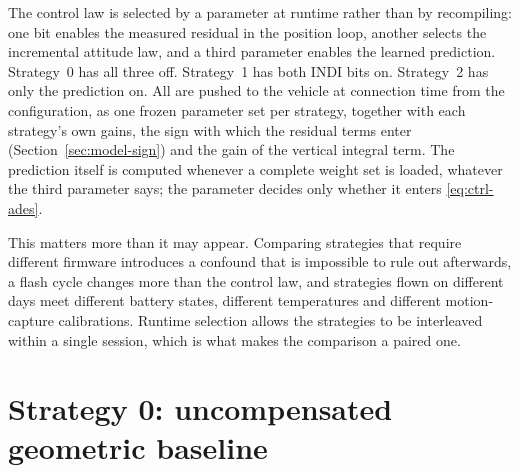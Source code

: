 The control law is selected by a parameter at runtime rather than by recompiling: one bit enables
the measured residual in the position loop, another selects the incremental attitude law, and a
third parameter enables the learned prediction. Strategy~0 has all three off. Strategy~1 has both
INDI bits on. Strategy~2 has only the prediction on. All are pushed to the vehicle at connection time
from the configuration, as one frozen parameter set per strategy, together with each strategy's own gains, the sign with which the
residual terms enter (Section~\ref{sec:model-sign}) and the gain of the vertical integral term. The
prediction itself is computed whenever a complete weight set is loaded, whatever the third
parameter says; the parameter decides only whether it enters \eqref{eq:ctrl-ades}.

This matters more than it may appear. Comparing strategies that require different firmware
introduces a confound that is impossible to rule out afterwards, a flash cycle changes more than
the control law, and strategies flown on different days meet different battery states, different
temperatures and different motion-capture calibrations. Runtime selection allows the strategies to
be interleaved within a single session, which is what makes the comparison a paired one.

\section{Strategy 0: uncompensated geometric baseline}
\label{sec:ctrl-s0}

